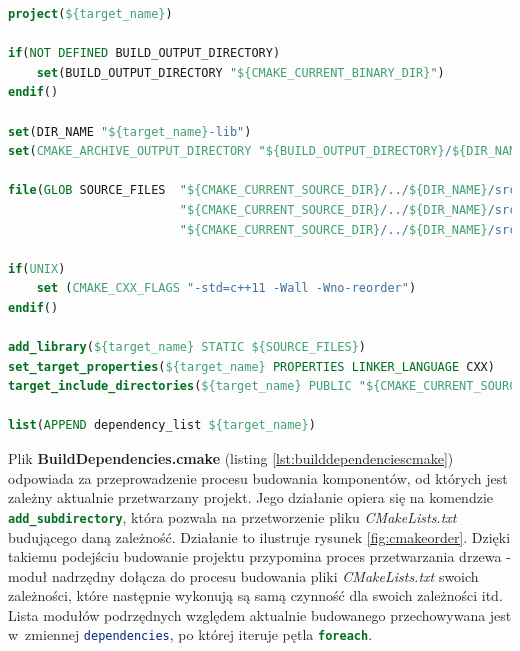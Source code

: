 \begin{lstlisting}[language=cmake, caption={Plik \textit{BuildLibrary.cmake} będący częścią systemu budującego projekt \gls*{ggss}. Poszczególne linie odpowiadają m.in. za dodanie nowego projektu, określenie katalogu, w~którym odbędzie się budowanie i~katalogu docelowego, zebranie plików biblioteki oraz dodanie jej do projektu. }, label={lst:buildlibrarycmake}]
project(${target_name})

if(NOT DEFINED BUILD_OUTPUT_DIRECTORY)
    set(BUILD_OUTPUT_DIRECTORY "${CMAKE_CURRENT_BINARY_DIR}")
endif()

set(DIR_NAME "${target_name}-lib")
set(CMAKE_ARCHIVE_OUTPUT_DIRECTORY "${BUILD_OUTPUT_DIRECTORY}/${DIR_NAME}/lib") 

file(GLOB SOURCE_FILES  "${CMAKE_CURRENT_SOURCE_DIR}/../${DIR_NAME}/src/*.cpp"
                        "${CMAKE_CURRENT_SOURCE_DIR}/../${DIR_NAME}/src/*.cxx"
                        "${CMAKE_CURRENT_SOURCE_DIR}/../${DIR_NAME}/src/*.c")

if(UNIX)
    set (CMAKE_CXX_FLAGS "-std=c++11 -Wall -Wno-reorder")
endif()

add_library(${target_name} STATIC ${SOURCE_FILES})
set_target_properties(${target_name} PROPERTIES LINKER_LANGUAGE CXX)
target_include_directories(${target_name} PUBLIC "${CMAKE_CURRENT_SOURCE_DIR}/include")

list(APPEND dependency_list ${target_name})
\end{lstlisting}

\newpage

Plik \textbf{BuildDependencies.cmake} (listing \ref{lst:builddependenciescmake}) odpowiada za przeprowadzenie procesu budowania komponentów, od których jest zależny aktualnie przetwarzany projekt. Jego działanie opiera się na komendzie \lstinline[language=cmake]{add_subdirectory}, która pozwala na przetworzenie pliku \textit{CMakeLists.txt} budującego daną zależność. Działanie to ilustruje rysunek \ref{fig:cmakeorder}. Dzięki takiemu podejściu budowanie projektu przypomina proces przetwarzania drzewa - moduł nadrzędny dołącza do procesu budowania pliki \textit{CMakeLists.txt} swoich zależności, które następnie wykonują są samą czynność dla swoich zależności itd. Lista modułów podrzędnych względem aktualnie budowanego przechowywana jest w~zmiennej \lstinline[language=cmake]{dependencies}, po której iteruje pętla \lstinline[language=cmake]{foreach}.


